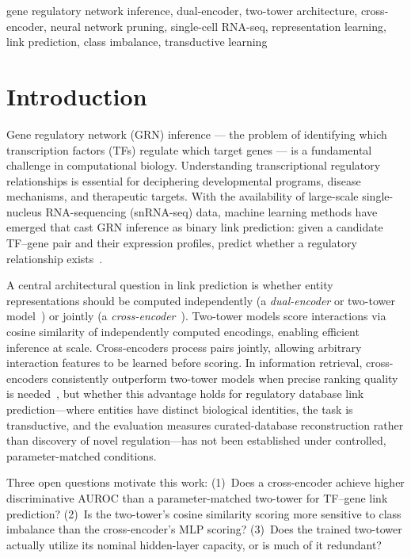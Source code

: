 \documentclass[journal]{IEEEtran}
\begin{document}
\begin{IEEEkeywords}
gene regulatory network inference, dual-encoder, two-tower architecture, cross-encoder,
neural network pruning, single-cell RNA-seq, representation
learning, link prediction, class imbalance, transductive learning
\end{IEEEkeywords}

\section{Introduction}
\label{sec:intro}

Gene regulatory network (GRN) inference --- the problem of identifying which
transcription factors (TFs) regulate which target genes --- is a fundamental
challenge in computational biology. Understanding transcriptional regulatory
relationships is essential for deciphering developmental programs, disease
mechanisms, and therapeutic targets. With the availability of large-scale
single-nucleus RNA-sequencing (snRNA-seq) data, machine learning methods have
emerged that cast GRN inference as binary link prediction: given a candidate
TF--gene pair and their expression profiles, predict whether a regulatory
relationship exists~\cite{aibar2017,huynh2010}.

A central architectural question in link prediction is whether entity
representations should be computed independently (a \emph{dual-encoder} or
two-tower model~\cite{huang2013,bromley1993}) or jointly (a
\emph{cross-encoder}~\cite{nogueira2019,humeau2020}). Two-tower models score
interactions via cosine similarity of independently computed encodings,
enabling efficient inference at scale. Cross-encoders process pairs jointly,
allowing arbitrary interaction features to be learned before scoring. In
information retrieval, cross-encoders consistently outperform two-tower models
when precise ranking quality is needed~\cite{nogueira2019,humeau2020}, but
whether this advantage holds for regulatory database link prediction---where
entities have distinct biological identities, the task is transductive, and
the evaluation measures curated-database reconstruction rather than discovery
of novel regulation---has not been established under controlled,
parameter-matched conditions.

Three open questions motivate this work: (1)~Does a cross-encoder achieve
higher discriminative AUROC than a parameter-matched two-tower for TF--gene
link prediction? (2)~Is the two-tower's cosine similarity scoring more
sensitive to class imbalance than the cross-encoder's MLP scoring?
(3)~Does the trained two-tower actually utilize its nominal hidden-layer
capacity, or is much of it redundant?
\end{document}
